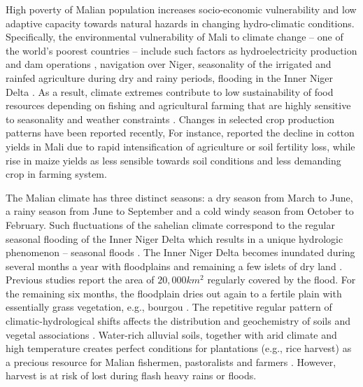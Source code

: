 \documentclass[12pt,a4paper,oneside]{article}
\def \newpar{\vspace{6pt}}
\begin{document}
\newpar High poverty of Malian population increases socio-economic vulnerability and low adaptive capacity towards natural hazards in changing hydro-climatic conditions. Specifically, the environmental vulnerability of Mali to climate change -- one of the world’s poorest countries -- include such factors as hydroelectricity production and dam operations \citep{w11091766}, navigation over Niger, seasonality of the irrigated and rainfed agriculture during dry and rainy periods, flooding in the Inner Niger Delta \citep{Ghile}. As a result, climate extremes contribute to low sustainability of food resources depending on fishing and agricultural farming that are highly sensitive to seasonality and weather constraints \citep{Morand,LIERSCH2019176}. Changes in selected crop production patterns have been reported recently, For instance, \citep{LARIS20151} reported the decline in cotton yields in Mali due to rapid intensification of agriculture or soil fertility loss, while rise in maize yields as less sensible towards soil conditions and less demanding crop in farming system.

\newpar The Malian climate has three distinct seasons: a dry season from March to June, a rainy season from June to September and a cold windy season from October to February. Such fluctuations of the sahelian climate correspond to the regular seasonal flooding of the Inner Niger Delta which results in a unique hydrologic phenomenon -- seasonal floods \citep{brunet1986monographie}. The Inner Niger Delta becomes inundated during several months a year with floodplains and remaining a few islets of dry land \citep{Courel}. Previous studies report \citep{Diakite} the area of $20,000 km^2$ regularly covered by the flood. For the remaining six months, the floodplain dries out again to a fertile plain with essentially grass vegetation, e.g., bourgou \citep{Planhol}. The repetitive regular pattern of climatic-hydrological shifts affects the distribution and geochemistry of soils and vegetal associations \citep{Tabeaud}. Water-rich alluvial soils, together with arid climate and high temperature creates perfect conditions for plantations (e.g., rice harvest) as a precious resource for Malian fishermen, pastoralists and farmers \citep{Retaille}. However, harvest is at risk of lost during flash heavy rains or floods. 
\end{document}

